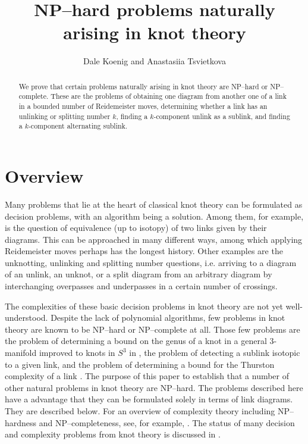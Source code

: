 \documentclass[12pt]{amsart}
\theoremstyle{definition}
\theoremstyle{remark}
\begin{document}
\title{NP--hard problems naturally arising in knot theory}
\author{Dale Koenig and Anastasiia Tsvietkova}
\date{}
 \footnotesize
 \begin{abstract}
We prove that certain problems naturally arising in knot theory are NP--hard or NP--complete. These are the problems of obtaining one diagram from another one of a link in a bounded number of Reidemeister moves, determining whether a link has an unlinking or splitting number $k$, finding a $k$-component unlink as a sublink, and finding a $k$-component alternating sublink.
\end{abstract}
\maketitle
\normalsize
\section{Overview}



Many problems that lie at the heart of classical knot theory can be formulated as decision problems, with an algorithm being a solution. Among them, for example, is the question of equivalence (up to isotopy) of two links given by their diagrams. This can be approached in many different ways, among which applying Reidemeister moves perhaps has the longest history. Other examples are the unknotting, unlinking and splitting number questions, i.e. arriving to a diagram of an unlink, an unknot, or a split diagram from an arbitrary diagram by interchanging overpasses and underpasses in a certain number of crossings.

The complexities of these basic decision problems in knot theory are not yet well-understood. Despite the lack of polynomial algorithms, few problems in knot theory are known to be NP--hard or NP--complete at all. Those few problems are the problem of determining a bound on the genus of a knot in a general 3-manifold \cite{AgolHassThurston1} improved to knots in $S^3$ in \cite{Lackenby1}, the problem of detecting a sublink isotopic to a given link, and the problem of determining a bound for the Thurston complexity of a link  \cite{Lackenby1}. The purpose of this paper to establish that a number of other natural problems in knot theory are NP--hard. The problems described here have a advantage that they can be formulated solely in terms of link diagrams.  They are described below. For an overview of complexity theory including NP--hardness and NP--completeness, see, for example, \cite{GareyJohnson1}. The status of many decision and complexity problems from knot theory is discussed in \cite{Lackenby3}.
\end{document}

